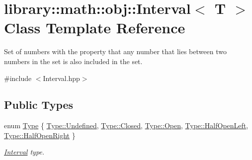 \hypertarget{classlibrary_1_1math_1_1obj_1_1_interval}{}\section{library\+:\+:math\+:\+:obj\+:\+:Interval$<$ T $>$ Class Template Reference}
\label{classlibrary_1_1math_1_1obj_1_1_interval}


Set of numbers with the property that any number that lies between two numbers in the set is also included in the set.  




{\ttfamily \#include $<$Interval.\+hpp$>$}

\subsection*{Public Types}
\begin{DoxyCompactItemize}
\item 
enum \hyperlink{classlibrary_1_1math_1_1obj_1_1_interval_abc7177f1c446d8273e70c989953667d1}{Type} \{ \newline
\hyperlink{classlibrary_1_1math_1_1obj_1_1_interval_abc7177f1c446d8273e70c989953667d1aec0fc0100c4fc1ce4eea230c3dc10360}{Type\+::\+Undefined}, 
\hyperlink{classlibrary_1_1math_1_1obj_1_1_interval_abc7177f1c446d8273e70c989953667d1a03f4a47830f97377a35321051685071e}{Type\+::\+Closed}, 
\hyperlink{classlibrary_1_1math_1_1obj_1_1_interval_abc7177f1c446d8273e70c989953667d1ac3bf447eabe632720a3aa1a7ce401274}{Type\+::\+Open}, 
\hyperlink{classlibrary_1_1math_1_1obj_1_1_interval_abc7177f1c446d8273e70c989953667d1ab5e08f9173f660e791d3ba99ff8281d7}{Type\+::\+Half\+Open\+Left}, 
\newline
\hyperlink{classlibrary_1_1math_1_1obj_1_1_interval_abc7177f1c446d8273e70c989953667d1a484f1b37e0208f622a1e6f7a3ff8c2c3}{Type\+::\+Half\+Open\+Right}
 \}\begin{DoxyCompactList}\small\item\em \hyperlink{classlibrary_1_1math_1_1obj_1_1_interval}{Interval} type. \end{DoxyCompactList}
\end{DoxyCompactItemize}
